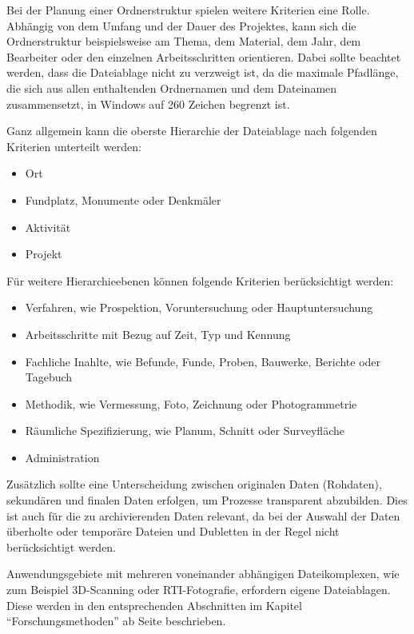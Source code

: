 Bei der Planung einer Ordnerstruktur spielen weitere Kriterien eine Rolle. Abhängig von dem Umfang und der Dauer des Projektes, kann sich die Ordnerstruktur beispielsweise am Thema, dem Material, dem Jahr, dem Bearbeiter oder den einzelnen Arbeitsschritten orientieren. Dabei sollte beachtet werden, dass die Dateiablage nicht zu verzweigt ist, da die maximale Pfadlänge, die sich aus allen enthaltenden Ordnernamen und dem Dateinamen zusammensetzt, in Windows auf 260 Zeichen begrenzt ist.

Ganz allgemein kann die oberste Hierarchie der Dateiablage nach folgenden Kriterien unterteilt werden:
\begin{itemize}
	\item Ort
	\item Fundplatz, Monumente oder Denkmäler
	\item Aktivität
	\item Projekt
\end{itemize}

Für weitere Hierarchieebenen können folgende Kriterien berücksichtigt werden:
\begin{itemize}
	\item Verfahren, wie Prospektion, Voruntersuchung oder Hauptuntersuchung
	\item Arbeitsschritte mit Bezug auf Zeit, Typ und Kennung
	\item Fachliche Inahlte, wie Befunde, Funde, Proben, Bauwerke, Berichte oder Tagebuch
	\item Methodik, wie Vermessung, Foto, Zeichnung oder Photogrammetrie
	\item Räumliche Spezifizierung, wie Planum, Schnitt oder Surveyfläche
	\item Administration
\end{itemize}

Zusätzlich sollte eine Unterscheidung zwischen originalen Daten (Rohdaten), sekundären und finalen Daten erfolgen, um Prozesse transparent abzubilden. Dies ist auch für die zu archivierenden Daten relevant, da bei der Auswahl der Daten überholte oder temporäre Dateien und Dubletten in der Regel nicht berücksichtigt werden.

Anwendungsgebiete mit mehreren voneinander abhängigen Dateikomplexen, wie zum Beispiel 3D-Scanning oder RTI-Fotografie, erfordern eigene Dateiablagen. Diese werden in den entsprechenden Abschnitten im Kapitel "`Forschungsmethoden"' ab Seite \pageref{methoden} beschrieben.